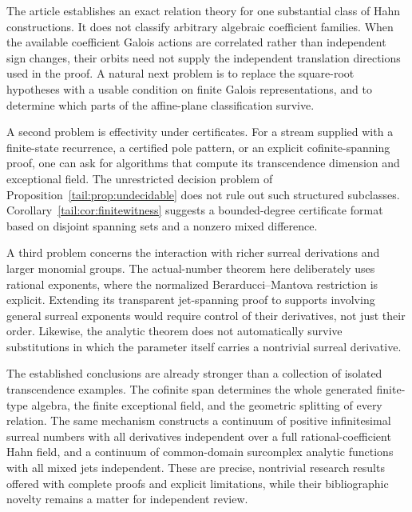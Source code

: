 \documentclass[11pt,a4paper]{article}
\numberwithin{equation}{section}
\theoremstyle{definition}
\theoremstyle{remark}
\begin{document}
The article establishes an exact relation theory for one substantial
class of Hahn constructions. It does not classify arbitrary algebraic
coefficient families. When the available coefficient Galois actions are
correlated rather than independent sign changes, their orbits need not
supply the independent translation directions used in the proof.
A natural next problem is to replace the square-root hypotheses with a
usable condition on finite Galois representations, and to determine which
parts of the affine-plane classification survive.

A second problem is effectivity under certificates. For a stream supplied
with a finite-state recurrence, a certified pole pattern, or an explicit
cofinite-spanning proof, one can ask for algorithms that compute its
transcendence dimension and exceptional field. The unrestricted decision
problem of Proposition~\ref{tail:prop:undecidable} does not rule out such
structured subclasses. Corollary~\ref{tail:cor:finitewitness} suggests a
bounded-degree certificate format based on disjoint spanning sets and a
nonzero mixed difference.

A third problem concerns the interaction with richer surreal derivations
and larger monomial groups. The actual-number theorem here deliberately
uses rational exponents, where the normalized Berarducci--Mantova
restriction is explicit. Extending its transparent jet-spanning proof to
supports involving general surreal exponents would require control of
their derivatives, not just their order. Likewise, the analytic theorem
does not automatically survive substitutions in which the parameter
itself carries a nontrivial surreal derivative.

The established conclusions are already stronger than a collection of
isolated transcendence examples. The cofinite span determines the whole
generated finite-type algebra, the finite exceptional field, and the
geometric splitting of every relation. The same mechanism constructs a
continuum of positive infinitesimal surreal numbers with all derivatives
independent over a full rational-coefficient Hahn field, and a continuum
of common-domain surcomplex analytic functions with all mixed jets
independent. These are precise, nontrivial research results offered with
complete proofs and explicit limitations, while their bibliographic
novelty remains a matter for independent review.

\clearpage
\appendix
\end{document}
